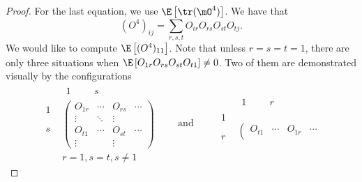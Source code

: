 \begin{proof}
    For the last equation, we use $\E\left[ \tr(\mO^4) \right]$.  We have that 
    \[
        (O^4)_{ij} = \sum_{r,s,t} O_{ir} O_{rs} O_{st} O_{tj}.
    \]
    We would like to compute $\E\left[ (O^4)_{11} \right]$.  Note that
    unless $r=s=t=1$, there are only three situations when
    $\E \left[ O_{1r} O_{rs} O_{st} O_{t1} \right] \neq 0$.   Two of them are 
    demonstrated visually by the configurations
    \[
        \begin{matrix}
            \phantom{0} &
            \begin{matrix} 
                1 & \phantom{\cdots} & s \phantom{\cdots}
            \end{matrix} \\
            \begin{matrix}
                1 \\
                \phantom{\vdots}  \\
                s \\
                \phantom{\vdots}
            \end{matrix}&
            \left(
            \begin{matrix}
                O_{1r} & \cdots & O_{rs} & \cdots \\
                \vdots  & \ddots & \vdots  & \\
                O_{t1} & \cdots & O_{st} & \cdots \\
                \vdots  &        & \vdots  &
            \end{matrix}
            \right) \\
            \phantom{0} &
            r=1, s=t, s \neq 1
        \end{matrix}
        \quad\quad\text{and}\quad\quad
        \begin{matrix}
            \phantom{0} &
            \begin{matrix} 
                1 & \phantom{\cdots} & r \phantom{\cdots}
            \end{matrix} \\
            \begin{matrix}
                1 \\
                \phantom{\vdots}  \\
                r \\
                \phantom{\vdots}
            \end{matrix}&
            \left(
            \begin{matrix}
                O_{t1} & \cdots & O_{1r} & \cdots \\

\end{matrix}
\end{matrix}\]
\end{proof}
